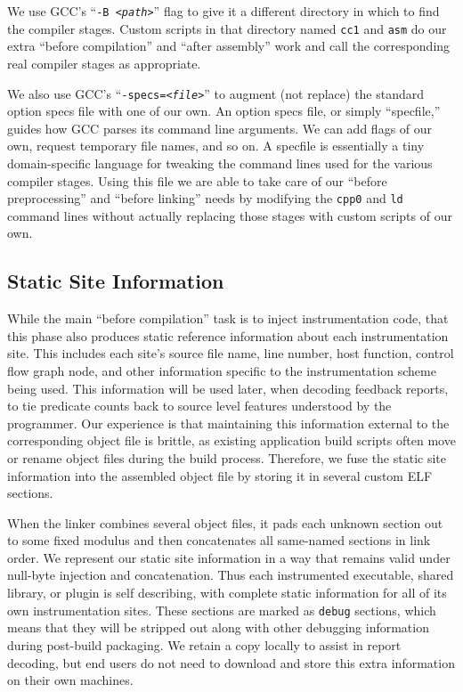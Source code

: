 \documentclass[10pt,twocolumn]{article}
\begin{document}
We use GCC's ``\texttt{-B \textit{<path>}}'' flag to give it a
different directory in which to find the compiler stages.  Custom
scripts in that directory named \texttt{cc1} and \texttt{asm} do our
extra ``before compilation'' and ``after assembly'' work and call the
corresponding real compiler stages as appropriate.

We also use GCC's ``\texttt{-specs=\textit{<file>}}'' to augment (not
replace) the standard option specs file with one of our own.  An
option specs file, or simply ``specfile,'' guides how GCC parses its
command line arguments.  We can add flags of our own, request
temporary file names, and so on.  A specfile is essentially a tiny
domain-specific language for tweaking the command lines used for the
various compiler stages.  Using this file we are able to take care of
our ``before preprocessing'' and ``before linking'' needs by modifying
the \texttt{cpp0} and \texttt{ld} command lines without actually
replacing those stages with custom scripts of our own.

\subsection{Static Site Information}

While the main ``before compilation'' task is to inject
instrumentation code, that this phase also produces static reference
information about each instrumentation site.  This includes each
site's source file name, line number, host function, control flow
graph node, and other information specific to the instrumentation
scheme being used.  This information will be used later, when decoding
feedback reports, to tie predicate counts back to source level
features understood by the programmer.  Our experience is that
maintaining this information external to the corresponding object file
is brittle, as existing application build scripts often move or rename
object files during the build process.  Therefore, we fuse the static
site information into the assembled object file by storing it in
several custom ELF sections.

When the linker combines several object files, it pads each unknown
section out to some fixed modulus and then concatenates all same-named
sections in link order.  We represent our static site information in a
way that remains valid under null-byte injection and concatenation.
Thus each instrumented executable, shared library, or plugin is self
describing, with complete static information for all of its own
instrumentation sites.  These sections are marked as \texttt{debug}
sections, which means that they will be stripped out along with other
debugging information during post-build packaging.  We retain a copy
locally to assist in report decoding, but end users do not need to
download and store this extra information on their own machines.
\end{document}
